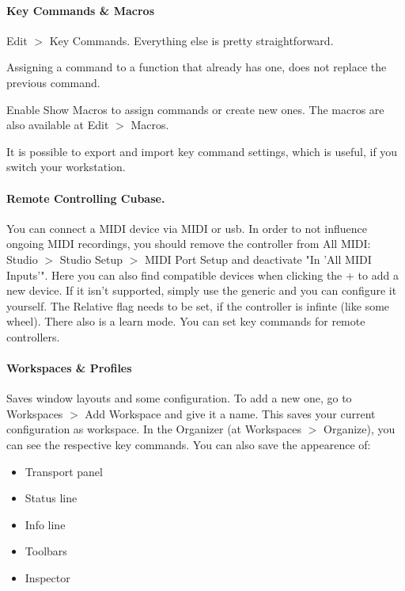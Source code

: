 \documentclass[10pt]{article}
\begin{document}
\paragraph{Key Commands \& Macros} Edit $>$ Key Commands. Everything else is pretty straightforward.

Assigning a command to a function that already has one, does not replace the previous command.

Enable Show Macros to assign commands or create new ones. The macros are also available at Edit $>$ Macros.

It is possible to export and import key command settings, which is useful, if you switch your workstation.

\paragraph{Remote Controlling Cubase.} You can connect a MIDI device via MIDI or usb. In order to not influence ongoing MIDI recordings, you should remove the controller from All MIDI: Studio $>$ Studio Setup $>$ MIDI Port Setup and deactivate "In 'All MIDI Inputs'". Here you can also find compatible devices when clicking the + to add a new device. If it isn't supported, simply use the generic and you can configure it yourself. The Relative flag needs to be set, if the controller is infinte (like some wheel). There also is a learn mode. You can set key commands for remote controllers.

\paragraph{Workspaces \& Profiles} Saves window layouts and some configuration. To add a new one, go to Workspaces $>$ Add Workspace and give it a name. This saves your current configuration as workspace. In the Organizer (at Workspaces $>$ Organize), you can see the respective key commands. You can also save the appearence of:
\begin{itemize}
	\item Transport panel
	\item Status line
	\item Info line
	\item Toolbars
	\item Inspector
\end{itemize}
\end{document}
